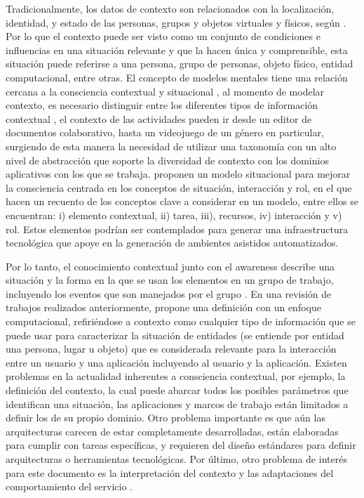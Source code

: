 Tradicionalmente, los datos de contexto son relacionados con la localización, identidad, y estado de las personas, grupos y objetos virtuales y físicos, según \citep{Souza2013}. Por lo que el contexto puede ser visto como un conjunto de condiciones e influencias en una situación relevante y que la hacen única y comprensible, esta situación puede referirse a una persona, grupo de personas, objeto físico, entidad computacional, entre otras. El concepto de modelos mentales tiene una relación cercana a la consciencia contextual y situacional \citep{Aehnelt2012}, al momento de modelar contexto, es necesario distinguir entre los diferentes tipos de información contextual \citet{Hoyos2013}, el contexto de las actividades pueden ir desde un editor de documentos colaborativo, hasta un videojuego de un género en particular, surgiendo de esta manera la necesidad de utilizar una taxonomía con un alto nivel de abstracción que soporte la diversidad de contexto con los dominios aplicativos con los que se trabaja. \citet{Eynard2013} proponen un modelo situacional para mejorar la consciencia centrada en los conceptos de situación, interacción y rol, en el que hacen un recuento de los conceptos clave a considerar en un modelo, entre ellos se encuentran: i) elemento contextual, ii) tarea, iii), recursos, iv) interacción y v) rol. Estos elementos podrían ser contemplados para generar una infraestructura tecnológica que apoye en la generación de ambientes asistidos automatizados.

Por lo tanto, el conocimiento contextual junto con el awareness describe una situación y la forma en la que se usan los elementos en un grupo de trabajo, incluyendo los eventos que son manejados por el grupo \citep{Brezillon2004}. En una revisión de trabajos realizados anteriormente, \citet{Dey2001} propone una definición con un enfoque computacional, refiriéndose a contexto como cualquier tipo de información que se puede usar para caracterizar la situación de entidades (se entiende por entidad una persona, lugar u objeto) que es considerada relevante para la interacción entre un usuario y una aplicación incluyendo al usuario y la aplicación. Existen problemas en la actualidad inherentes a consciencia contextual, por ejemplo, la definición del contexto, la cual puede abarcar todos los posibles parámetros que identifican una situación, las aplicaciones y marcos de trabajo están limitados a definir los de su propio dominio. Otro problema importante es que aún las arquitecturas carecen de estar completamente desarrolladas, están elaboradas para cumplir con tareas específicas, y requieren del diseño estándares para definir arquitecturas o herramientas tecnológicas. Por último, otro problema de interés para este documento es la interpretación del contexto y las adaptaciones del comportamiento del servicio \citep{Mahmud2007}.


